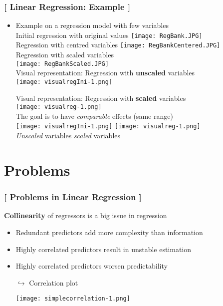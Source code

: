 \documentclass[xcolor=x11names,compress]{beamer}
\renewcommand{\(}{\begin{columns}}
\renewcommand{\)}{\end{columns}}
\newcommand{\<}[1]{\begin{column}{#1}}
\renewcommand{\>}{\end{column}}
\begin{document}
\begin{frame} %
\frametitle{\textcolor{brique}{[ Linear Regression: Example ]}}
\pause
\begin{itemize}
\item Example on a regression model with few variables\\
   {Initial regression with original values}
   {\texttt{[image: RegBank.JPG]} \\ }
   {Regression with centred variables}
   { \texttt{[image: RegBankCentered.JPG]} \\ }
   {Regression with scaled variables \\ }
   {\texttt{[image: RegBankScaled.JPG]} \\ }
   {Visual representation: Regression with \textbf{unscaled} variables \\ }
   {\texttt{[image: visualregIni-1.png]} \\ }
  
   {Visual representation: Regression with \textbf{scaled} variables \\ }
   {\texttt{[image: visualreg-1.png]} \\ }
   {The goal is to have \textit{comparable} effects (same range)\\ }
   {\texttt{[image: visualregIni-1.png]} \texttt{[image: visualreg-1.png]} \\ }
   {\emph{Unscaled} variables \hfill \emph{scaled} variables \\ }
\end{itemize}
\end{frame}


\section{Problems}

\begin{frame} %
\frametitle{\textcolor{brique}{[ Problems in Linear Regression ]}}
\textbf{Collinearity } of regressors is a big issue in regression
\pause
\begin{itemize}[<+->]
  \item Redundant predictors add more complexity than information
  \item Highly correlated predictors result in unstable estimation
  \item Highly correlated predictors worsen predictability
  \item[$\hookrightarrow$] Correlation plot
  \item[] \texttt{[image: simplecorrelation-1.png]}
\end{itemize}
\end{frame}
\end{document}
